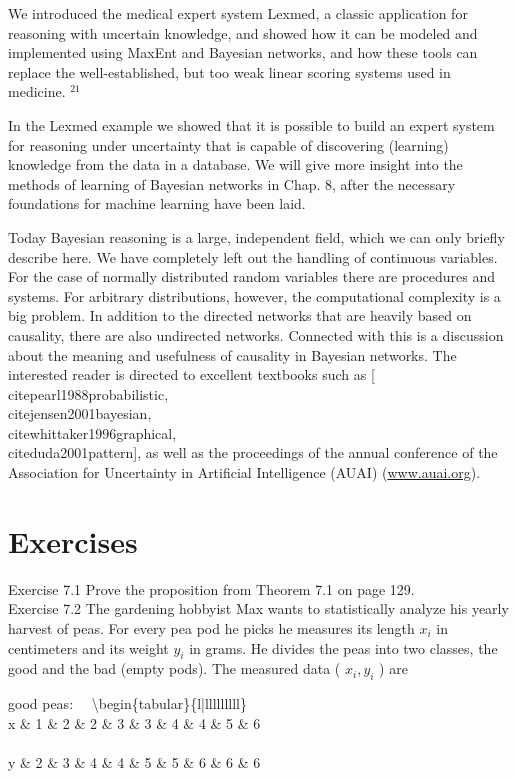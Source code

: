 \documentclass[10pt]{book}
\begin{document}
We introduced the medical expert system Lexmed, a classic application for reasoning with uncertain knowledge, and showed how it can be modeled and implemented using MaxEnt and Bayesian networks, and how these tools can replace the well-established, but too weak linear scoring systems used in medicine. ${ }^{21}$

In the Lexmed example we showed that it is possible to build an expert system for reasoning under uncertainty that is capable of discovering (learning) knowledge from the data in a database. We will give more insight into the methods of learning of Bayesian networks in Chap. 8, after the necessary foundations for machine learning have been laid.

Today Bayesian reasoning is a large, independent field, which we can only briefly describe here. We have completely left out the handling of continuous variables. For the case of normally distributed random variables there are procedures and systems. For arbitrary distributions, however, the computational complexity is a big problem. In addition to the directed networks that are heavily based on causality, there are also undirected networks. Connected with this is a discussion about the meaning and usefulness of causality in Bayesian networks. The interested reader is directed to excellent textbooks such as [\\cite{pearl1988probabilistic}, \\cite{jensen2001bayesian}, \\cite{whittaker1996graphical}, \\cite{duda2001pattern}], as well as the proceedings of the annual conference of the Association for Uncertainty in Artificial Intelligence (AUAI) (\href{http://www.auai.org}{www.auai.org}).

\section{Exercises}
Exercise 7.1 Prove the proposition from Theorem 7.1 on page 129.\\
Exercise 7.2 The gardening hobbyist Max wants to statistically analyze his yearly harvest of peas. For every pea pod he picks he measures its length $x_{i}$ in centimeters and its weight $y_{i}$ in grams. He divides the peas into two classes, the good and the bad (empty pods). The measured data ( $x_{i}, y_{i}$ ) are

good peas: $\quad$\textbackslash begin\{tabular\}\{l|lllllllll\}\\
x \& 1 \& 2 \& 2 \& 3 \& 3 \& 4 \& 4 \& 5 \& 6 \\
\\
y \& 2 \& 3 \& 4 \& 4 \& 5 \& 5 \& 6 \& 6 \& 6
\end{document}
